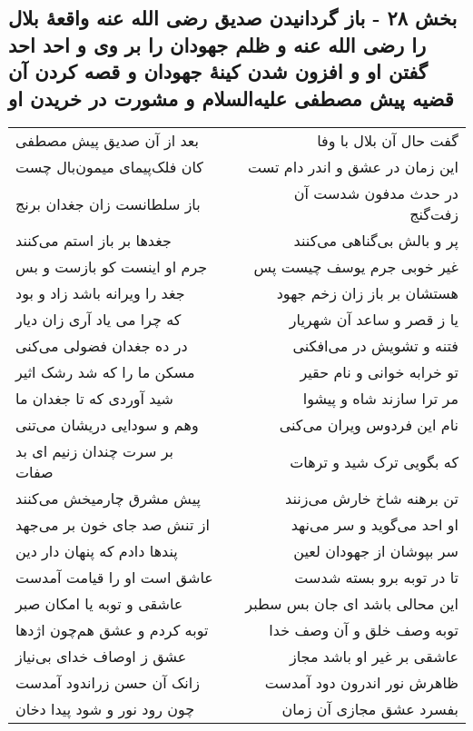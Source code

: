 \begin{center}
\section*{بخش ۲۸ - باز گردانیدن صدیق رضی الله عنه واقعهٔ بلال را رضی الله عنه و ظلم جهودان را بر وی و احد احد گفتن او و افزون شدن کینهٔ جهودان و قصه کردن آن قضیه پیش مصطفی علیه‌السلام و مشورت در خریدن او}
\label{sec:sh028}
\begin{longtable}{l p{0.5cm} r}
بعد از آن صدیق پیش مصطفی
&&
گفت حال آن بلال با وفا
\\
کان فلک‌پیمای میمون‌بال چست
&&
این زمان در عشق و اندر دام تست
\\
باز سلطانست زان جغدان برنج
&&
در حدث مدفون شدست آن زفت‌گنج
\\
جغدها بر باز استم می‌کنند
&&
پر و بالش بی‌گناهی می‌کنند
\\
جرم او اینست کو بازست و بس
&&
غیر خوبی جرم یوسف چیست پس
\\
جغد را ویرانه باشد زاد و بود
&&
هستشان بر باز زان زخم جهود
\\
که چرا می یاد آری زان دیار
&&
یا ز قصر و ساعد آن شهریار
\\
در ده جغدان فضولی می‌کنی
&&
فتنه و تشویش در می‌افکنی
\\
مسکن ما را که شد رشک اثیر
&&
تو خرابه خوانی و نام حقیر
\\
شید آوردی که تا جغدان ما
&&
مر ترا سازند شاه و پیشوا
\\
وهم و سودایی دریشان می‌تنی
&&
نام این فردوس ویران می‌کنی
\\
بر سرت چندان زنیم ای بد صفات
&&
که بگویی ترک شید و ترهات
\\
پیش مشرق چارمیخش می‌کنند
&&
تن برهنه شاخ خارش می‌زنند
\\
از تنش صد جای خون بر می‌جهد
&&
او احد می‌گوید و سر می‌نهد
\\
پندها دادم که پنهان دار دین
&&
سر بپوشان از جهودان لعین
\\
عاشق است او را قیامت آمدست
&&
تا در توبه برو بسته شدست
\\
عاشقی و توبه یا امکان صبر
&&
این محالی باشد ای جان بس سطبر
\\
توبه کردم و عشق هم‌چون اژدها
&&
توبه وصف خلق و آن وصف خدا
\\
عشق ز اوصاف خدای بی‌نیاز
&&
عاشقی بر غیر او باشد مجاز
\\
زانک آن حسن زراندود آمدست
&&
ظاهرش نور اندرون دود آمدست
\\
چون رود نور و شود پیدا دخان
&&
بفسرد عشق مجازی آن زمان

\end{longtable}
\end{center}
